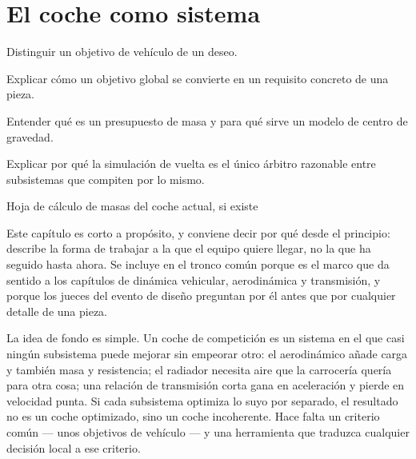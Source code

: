 \chapter{El coche como sistema}
\label{ch:coche_como_sistema}

\begin{objetivos}
  \item Distinguir un objetivo de vehículo de un deseo.
  \item Explicar cómo un objetivo global se convierte en un requisito concreto de
        una pieza.
  \item Entender qué es un presupuesto de masa y para qué sirve un modelo de
        centro de gravedad.
  \item Explicar por qué la simulación de vuelta es el único árbitro razonable
        entre subsistemas que compiten por lo mismo.
\end{objetivos}

%
{Hoja de cálculo de masas del coche actual, si existe}

Este capítulo es corto a propósito, y conviene decir por qué desde el principio:
describe la forma de trabajar a la que el equipo quiere llegar, no la que ha
seguido hasta ahora. Se incluye en el tronco común porque es el marco que da
sentido a los capítulos de dinámica vehicular, aerodinámica y transmisión, y
porque los jueces del evento de diseño preguntan por él antes que por cualquier
detalle de una pieza.

La idea de fondo es simple. Un coche de competición es un sistema en el que casi
ningún subsistema puede mejorar sin empeorar otro: el aerodinámico añade carga y
también masa y resistencia; el radiador necesita aire que la carrocería quería
para otra cosa; una relación de transmisión corta gana en aceleración y pierde en
velocidad punta. Si cada subsistema optimiza lo suyo por separado, el resultado no
es un coche optimizado, sino un coche incoherente. Hace falta un criterio común
--- unos objetivos de vehículo --- y una herramienta que traduzca cualquier
decisión local a ese criterio.

